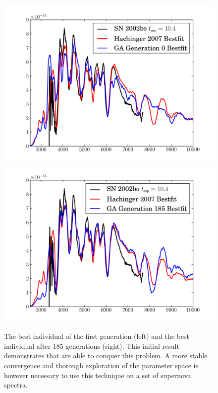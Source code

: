 \begin{figure}[tb] %
   \centering
   \includegraphics[width=1\textwidth]{chapter_dalek/plots/plot_ga0_speccompare.pdf} 
   \includegraphics[width=1\textwidth]{chapter_dalek/plots/plot_ga185_speccompare.pdf} 
   \caption[Results of optimisations with Genetic Algorithms]{The best individual of the first generation (left) and the best individual after 185 generations (right). This initial result demonstrates that  are able to conquer this problem. A more stable convergence and thorough exploration of the parameter space is however necessary to use this technique on a set of supernova spectra.}
   \label{fig:ga_fit}
\end{figure}

